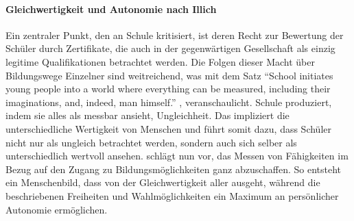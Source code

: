 \paragraph{Gleichwertigkeit und Autonomie nach Illich}

Ein zentraler Punkt, den \citeauthor{Illich-1971} an Schule kritisiert, ist deren Recht zur Bewertung der Schüler durch Zertifikate, die auch in der gegenwärtigen Gesellschaft als einzig legitime Qualifikationen betrachtet werden.
Die Folgen dieser Macht über Bildungswege Einzelner sind weitreichend, was \citeauthor{Illich-1971} mit dem Satz ``School initiates young people into a world where everything can be measured, including their imaginations, and, indeed, man himself.''  \parencite[19]{Illich-1971}, veranschaulicht.
Schule produziert, indem sie alles als messbar ansieht, Ungleichheit.
Das impliziert die unterschiedliche Wertigkeit von Menschen und führt somit dazu, dass Schüler nicht nur als ungleich betrachtet werden, sondern auch sich selber als unterschiedlich wertvoll ansehen.
\citeauthor{Illich-1971} schlägt nun vor, das Messen von Fähigkeiten im Bezug auf den Zugang zu Bildungsmöglichkeiten ganz abzuschaffen.
So entsteht ein Menschenbild, dass von der Gleichwertigkeit aller ausgeht, während die beschriebenen Freiheiten und Wahlmöglichkeiten ein Maximum an persönlicher Autonomie ermöglichen.
